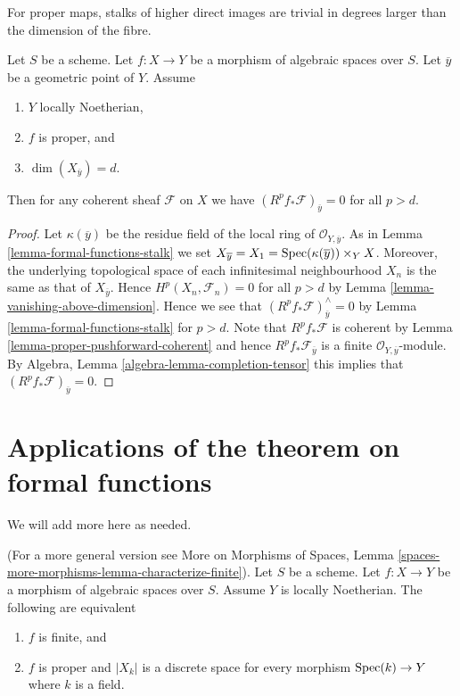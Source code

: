 \begin{lemma}
\label{lemma-higher-direct-images-zero-above-dimension-fibre}
\begin{slogan}
For proper maps, stalks of higher direct images are trivial in degrees
larger than the dimension of the fibre.
\end{slogan}
Let $S$ be a scheme.
Let $f : X \to Y$ be a morphism of algebraic spaces over $S$.
Let $\overline{y}$ be a geometric point of $Y$.
Assume
\begin{enumerate}
\item $Y$ locally Noetherian,
\item $f$ is proper, and
\item $\dim(X_{\overline{y}}) = d$.
\end{enumerate}
Then for any coherent sheaf $\mathcal{F}$ on $X$ we have
$(R^pf_*\mathcal{F})_{\overline{y}} = 0$ for all $p > d$.
\end{lemma}

\begin{proof}
Let $\kappa(\overline{y})$ be the residue field of the local
ring of $\mathcal{O}_{Y, \overline{y}}$. As in
Lemma \ref{lemma-formal-functions-stalk}
we set $X_{\overline{y}} = X_1 = \mathop{\mathrm{Spec}}(\kappa(\overline{y})) \times_Y X$.
Moreover, the underlying topological space of each infinitesimal
neighbourhood $X_n$ is the same as that of $X_{\overline{y}}$.
Hence $H^p(X_n, \mathcal{F}_n) = 0$ for all $p > d$ by
Lemma \ref{lemma-vanishing-above-dimension}.
Hence we see that $(R^pf_*\mathcal{F})_{\overline{y}}^\wedge = 0$
by Lemma \ref{lemma-formal-functions-stalk} for $p > d$.
Note that $R^pf_*\mathcal{F}$ is coherent by
Lemma \ref{lemma-proper-pushforward-coherent} and
hence $R^pf_*\mathcal{F}_{\overline{y}}$ is a finite
$\mathcal{O}_{Y, \overline{y}}$-module.
By Algebra, Lemma \ref{algebra-lemma-completion-tensor}
this implies that $(R^pf_*\mathcal{F})_{\overline{y}} = 0$.
\end{proof}






\section{Applications of the theorem on formal functions}
\label{section-applications-formal-functions}

\noindent
We will add more here as needed.

\begin{lemma}
\label{lemma-characterize-finite}
(For a more general version see
More on Morphisms of Spaces, Lemma
\ref{spaces-more-morphisms-lemma-characterize-finite}).
Let $S$ be a scheme.
Let $f : X \to Y$ be a morphism of algebraic spaces over $S$.
Assume $Y$ is locally Noetherian.
The following are equivalent
\begin{enumerate}
\item $f$ is finite, and
\item $f$ is proper and $|X_k|$ is a discrete space
for every morphism $\mathop{\mathrm{Spec}}(k) \to Y$ where $k$ is a field.
\end{enumerate}
\end{lemma}

